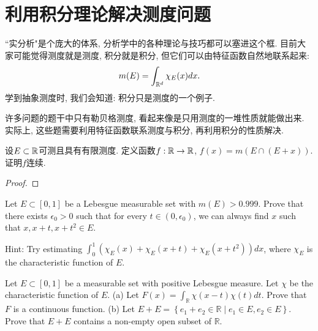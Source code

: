 \section{利用积分理论解决测度问题}
``实分析"是个庞大的体系, 分析学中的各种理论与技巧都可以塞进这个框.
目前大家可能觉得测度就是测度, 积分就是积分, 但它们可以由特征函数自然地联系起来:
$$m(E) = \int_{\mathbb{R}^d} \chi_{E}(x) dx.$$
学到抽象测度时, 我们会知道: 积分只是测度的一个例子. 

许多问题的题干中只有勒贝格测度, 看起来像是只用测度的一堆性质就能做出来. 实际上, 这些题需要利用特征函数联系测度与积分, 再利用积分的性质解决. 
\begin{example} %
    设$E \subset \mathbb{R}$可测且具有有限测度. 定义函数$f:\mathbb{R} \to \mathbb{R}$,
    $f(x)=m(E \cap(E+x))$. 证明$f$连续.
\end{example}
\begin{proof}
    
\end{proof}

\begin{example} %
    Let $E \subset[0,1]$ be a Lebesgue measurable set with $m(E)>0.999$. Prove that there exists $\epsilon_0>0$ such that for every $t \in\left(0, \epsilon_0\right)$, we can always find $x$ such that $x, x+t, x+t^2 \in E$.

    Hint: Try estimating $\int_0^1\left(\chi_E(x)+\chi_E(x+t)+\chi_E\left(x+t^2\right)\right) d x$, where $\chi_E$ is the characteristic function of $E$.
\end{example}

\begin{example} %
    Let $E \subset[0,1]$ be a measurable set with positive Lebesgue measure. Let $\chi$ be the characteristic function of $E$.
    (a) Let $F(x)=\int_{\mathbb{R}} \chi(x-t) \chi(t) d t$. Prove that $F$ is a continuous function.
    (b) Let $E+E=\left\{e_1+e_2 \in \mathbb{R} \mid e_1 \in E, e_2 \in E\right\}$. Prove that $E+E$ contains a non-empty open subset of $\mathbb{R}$.
\end{example}
